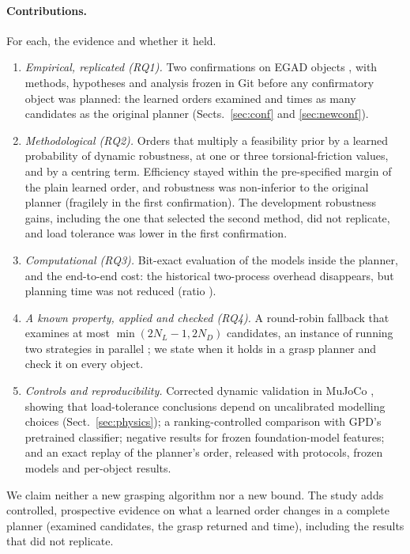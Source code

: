 \documentclass[pdflatex,sn-mathphys-num,iicol]{sn-jnl}
\begin{document}
\paragraph{Contributions.} For each, the evidence and whether it held.
\begin{enumerate}
\item \emph{Empirical, replicated (RQ1).} Two confirmations on EGAD objects \cite{morrison2020egad}, with methods, hypotheses and analysis frozen in Git before any confirmatory object was planned: the learned orders examined \confPoneRatio{} and \nxConeEff{} times as many candidates as the original planner (Sects.~\ref{sec:conf} and \ref{sec:newconf}).
\item \emph{Methodological (RQ2).} Orders that multiply a feasibility prior by a learned probability of dynamic robustness, at one or three torsional-friction values, and by a centring term. Efficiency stayed within the pre-specified margin of the plain learned order, and robustness was non-inferior to the original planner (fragilely in the first confirmation). The development robustness gains, including the one that selected the second method, did not replicate, and load tolerance was lower in the first confirmation.
\item \emph{Computational (RQ3).} Bit-exact evaluation of the models inside the planner, and the end-to-end cost: the historical two-process overhead disappears, but planning time was not reduced (ratio \nxCfourEff{} \nxCfourCI).
\item \emph{A known property, applied and checked (RQ4).} A round-robin fallback that examines at most $\min(2N_L-1, 2N_D)$ candidates, an instance of running two strategies in parallel \cite{vandenbrand2024dynamic,gomes2001portfolios}; we state when it holds in a grasp planner and check it on every object.
\item \emph{Controls and reproducibility.} Corrected dynamic validation in MuJoCo \cite{todorov2012mujoco}, showing that load-tolerance conclusions depend on uncalibrated modelling choices (Sect.~\ref{sec:physics}); a ranking-controlled comparison with GPD's pretrained classifier; negative results for frozen foundation-model features; and an exact replay of the planner's order, released with protocols, frozen models and per-object results.
\end{enumerate}
We claim neither a new grasping algorithm nor a new bound. The study adds controlled, prospective evidence on what a learned order changes in a complete planner (examined candidates, the grasp returned and time), including the results that did not replicate.
\end{document}
